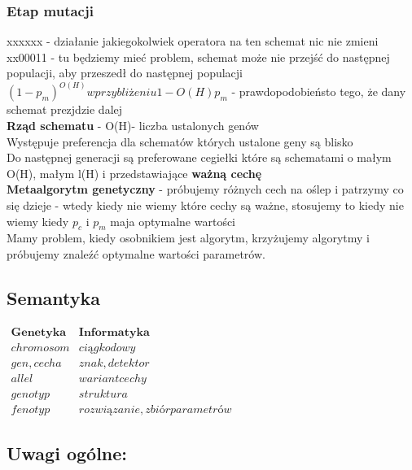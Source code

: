 \documentclass{article}
\begin{document}
			\subsubsection{Etap mutacji}
			xxxxxx - działanie jakiegokolwiek operatora na ten schemat nic nie zmieni\\
			xx00011 - tu będziemy mieć problem, schemat może nie przejść do następnej populacji, aby przeszedł do następnej populacji $(1-p_m)^{O(H)} w przybliżeniu 1-O(H)p_m$ - prawdopodobieństo tego, że dany schemat prezjdzie dalej \\
			\textbf{Rząd schematu} - O(H)- liczba ustalonych genów \\
			Występuje preferencja dla schematów których ustalone geny są blisko \\
			Do następnej generacji są preferowane cegiełki które są schematami o małym O(H), małym l(H) i przedstawiające \textbf{ważną cechę} \\
			\textbf{Metaalgorytm genetyczny} - próbujemy różnych cech na oślep i patrzymy co się dzieje - wtedy kiedy nie wiemy które cechy są ważne, stosujemy to kiedy nie wiemy kiedy $p_c$ i $p_m$ maja optymalne wartości \\
			Mamy problem, kiedy osobnikiem jest algorytm, krzyżujemy algorytmy i próbujemy znaleźć optymalne wartości parametrów.
			
		
		
		\subsection{Semantyka}
	$	\begin{array}{cc}
			\textbf{Genetyka} & \textbf{Informatyka} \\ 
			chromosom & ciąg kodowy \\ 
			gen, cecha & znak, detektor \\ 
			allel & wariant cechy \\ 
			genotyp & struktura \\ 
			fenotyp & rozwiązanie, zbiór parametrów
		\end{array} $
		\subsection{Uwagi ogólne:} 
\end{document}
